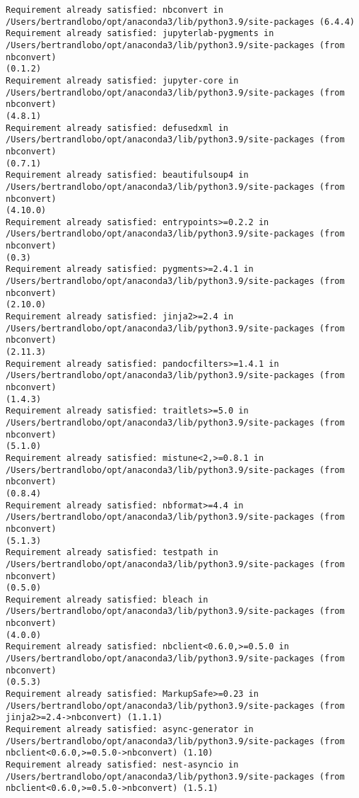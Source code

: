 \documentclass[11pt]{article}
\begin{document}
    \begin{Verbatim}[commandchars=\\\{\}]
Requirement already satisfied: nbconvert in
/Users/bertrandlobo/opt/anaconda3/lib/python3.9/site-packages (6.4.4)
Requirement already satisfied: jupyterlab-pygments in
/Users/bertrandlobo/opt/anaconda3/lib/python3.9/site-packages (from nbconvert)
(0.1.2)
Requirement already satisfied: jupyter-core in
/Users/bertrandlobo/opt/anaconda3/lib/python3.9/site-packages (from nbconvert)
(4.8.1)
Requirement already satisfied: defusedxml in
/Users/bertrandlobo/opt/anaconda3/lib/python3.9/site-packages (from nbconvert)
(0.7.1)
Requirement already satisfied: beautifulsoup4 in
/Users/bertrandlobo/opt/anaconda3/lib/python3.9/site-packages (from nbconvert)
(4.10.0)
Requirement already satisfied: entrypoints>=0.2.2 in
/Users/bertrandlobo/opt/anaconda3/lib/python3.9/site-packages (from nbconvert)
(0.3)
Requirement already satisfied: pygments>=2.4.1 in
/Users/bertrandlobo/opt/anaconda3/lib/python3.9/site-packages (from nbconvert)
(2.10.0)
Requirement already satisfied: jinja2>=2.4 in
/Users/bertrandlobo/opt/anaconda3/lib/python3.9/site-packages (from nbconvert)
(2.11.3)
Requirement already satisfied: pandocfilters>=1.4.1 in
/Users/bertrandlobo/opt/anaconda3/lib/python3.9/site-packages (from nbconvert)
(1.4.3)
Requirement already satisfied: traitlets>=5.0 in
/Users/bertrandlobo/opt/anaconda3/lib/python3.9/site-packages (from nbconvert)
(5.1.0)
Requirement already satisfied: mistune<2,>=0.8.1 in
/Users/bertrandlobo/opt/anaconda3/lib/python3.9/site-packages (from nbconvert)
(0.8.4)
Requirement already satisfied: nbformat>=4.4 in
/Users/bertrandlobo/opt/anaconda3/lib/python3.9/site-packages (from nbconvert)
(5.1.3)
Requirement already satisfied: testpath in
/Users/bertrandlobo/opt/anaconda3/lib/python3.9/site-packages (from nbconvert)
(0.5.0)
Requirement already satisfied: bleach in
/Users/bertrandlobo/opt/anaconda3/lib/python3.9/site-packages (from nbconvert)
(4.0.0)
Requirement already satisfied: nbclient<0.6.0,>=0.5.0 in
/Users/bertrandlobo/opt/anaconda3/lib/python3.9/site-packages (from nbconvert)
(0.5.3)
Requirement already satisfied: MarkupSafe>=0.23 in
/Users/bertrandlobo/opt/anaconda3/lib/python3.9/site-packages (from
jinja2>=2.4->nbconvert) (1.1.1)
Requirement already satisfied: async-generator in
/Users/bertrandlobo/opt/anaconda3/lib/python3.9/site-packages (from
nbclient<0.6.0,>=0.5.0->nbconvert) (1.10)
Requirement already satisfied: nest-asyncio in
/Users/bertrandlobo/opt/anaconda3/lib/python3.9/site-packages (from
nbclient<0.6.0,>=0.5.0->nbconvert) (1.5.1)

\end{Verbatim}
\end{document}
